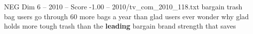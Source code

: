 \begin{textsample}{NEG Dim 6 – 2010 – Score -1.00 – 2010/tv\_com\_2010\_118.txt}  \label{ex:f6_neg_047}
bargain trash bag users go through 60 more bags a year than glad users ever wonder why glad holds more tough trash than the \textbf{leading} bargain brand strength that saves

\end{textsample}
